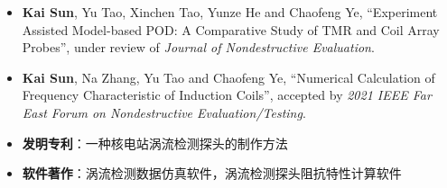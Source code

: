 \begin{itemize}
    \item \textbf{Kai Sun}, Yu Tao, Xinchen Tao, Yunze He and Chaofeng Ye,
          ``Experiment Assisted Model-based POD: A Comparative Study of TMR and Coil Array Probes'',
          under review of \emph{Journal of Nondestructive Evaluation}.\\
          { \footnotesize {}}
    \item \textbf{Kai Sun}, Na Zhang, Yu Tao and Chaofeng Ye,
          ``Numerical Calculation of Frequency Characteristic of Induction Coils'',
          accepted by \emph{2021 IEEE Far East Forum on Nondestructive Evaluation/Testing}.\\
          { \footnotesize {}}
    \item \textbf{发明专利}：一种核电站涡流检测探头的制作方法
    \item \textbf{软件著作}：涡流检测数据仿真软件，涡流检测探头阻抗特性计算软件
\end{itemize}